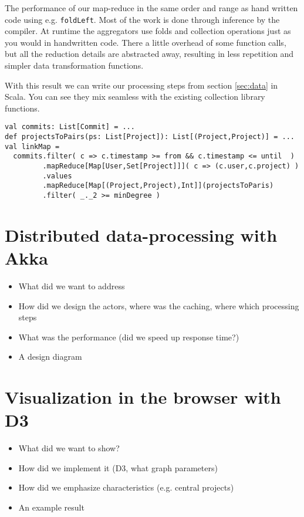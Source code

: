 \documentclass[10pt,a4paper]{article}
\begin{document}
The performance of our map-reduce in the same order and range as hand written code using e.g. \lstinline|foldLeft|. Most of the work is done through inference by the compiler. At runtime the aggregators use folds and collection operations just as you would in handwritten code. There a little overhead of some function calls, but all the reduction details are abstracted away, resulting in less repetition and simpler data transformation functions.

With this result we can write our processing steps from section \ref{sec:data} in Scala. You can see they mix seamless with the existing collection library functions.
\begin{lstlisting}
val commits: List[Commit] = ...
def projectsToPairs(ps: List[Project]): List[(Project,Project)] = ...
val linkMap = 
  commits.filter( c => c.timestamp >= from && c.timestamp <= until  )
         .mapReduce[Map[User,Set[Project]]]( c => (c.user,c.project) )
         .values
         .mapReduce[Map[(Project,Project),Int]](projectsToParis)
         .filter( _._2 >= minDegree )
\end{lstlisting}

\section{Distributed data-processing with Akka}\label{sec:distributed}

\begin{itemize}
    \item What did we want to address
    \item How did we design the actors, where was the caching, where which processing steps
    \item What was the performance (did we speed up response time?)
    \item A design diagram
\end{itemize}

\section{Visualization in the browser with D3}\label{sec:visualization}

\begin{itemize}
    \item What did we want to show?
    \item How did we implement it (D3, what graph parameters)
    \item How did we emphasize characteristics (e.g. central projects)
    \item An example result
\end{itemize}
\end{document}
